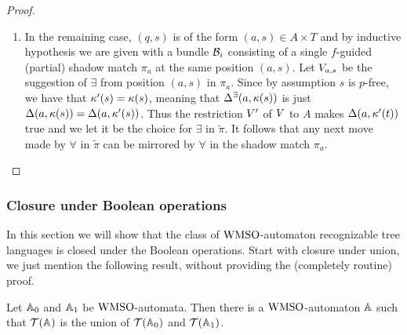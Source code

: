 \begin{proof}
\begin{enumerate}[label = (\Alph*), ref = \Alph*]
\begin{enumerate}[label = (\roman*), ref = \roman*]
  \end{enumerate}
  \item In the remaining case, $(q,s)$ is of the form $(a,s) \in A \times T$ and by inductive hypothesis we are given with a bundle $\mathcal{B}_i$ consisting of a single $f$-guided (partial) shadow match $\pi_a$ at the same position $(a,s)$. Let $V_{a,s}$ be the suggestion of $\exists$ from position $(a,s)$ in $\pi_a$. Since by assumption $s$ is $p$-free, we have that $\kappa'(s) = \kappa(s)$, meaning that $\Delta^\exists(a,\kappa(s))$ is just $\Delta(a,\kappa(s)) = \Delta(a,\kappa'(s))$. Thus the restriction $V'$ of $V$ to $A$ makes $\Delta(a,\kappa'(t))$ true and we let it be the choice for $\exists$ in $\tilde{\pi}$. It follows that any next move made by $\forall$ in $\tilde{\pi}$ can be mirrored by $\forall$ in the shadow match $\pi_a$.
      \begin{comment}Version with minimality:
      It follows that $\tmapProj(a,\tscolors(t))$ is just $\tmap(a,\tscolors(t)) = \tmap(a,\tscolors'(t))$ and the same valuation suggested by $f$ in $\pi_a$ is a legitimate choice for $\exists$ in $\tilde{\pi}$. By letting $\exists$ choose such valuation, it follows that any next move made by $\forall$ in $\tilde{\pi}$ can be mirrored by $\forall$ in the shadow match $\pi_a$.
      \end{comment}
\end{enumerate}
\end{proof} 


\subsubsection{Closure under Boolean operations}

In this section we will show that the class of $\mathrm{WMSO}$-automaton recognizable
tree languages is closed under the Boolean operations.
%
Start with closure under union, we just mention the following result, without
providing the (completely routine) proof.

\begin{proposition}
\label{t:cl-dis}
Let $\mathbb{A}_{0}$ and $\mathbb{A}_{1}$ be $\mathrm{WMSO}$-automata. 
Then there is a $\mathrm{WMSO}$-automaton $\mathbb{A}$ such that $\mathcal{T}(\mathbb{A})$ is the 
union of $\mathcal{T}(\mathbb{A}_{0})$ and $\mathcal{T}(\mathbb{A}_{1})$.
\end{proposition}

